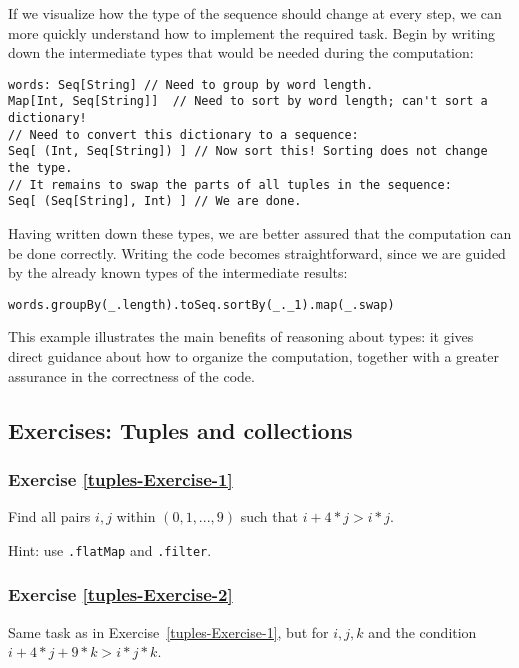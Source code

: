 If we visualize how the type of the sequence should change at every
step, we can more quickly understand how to implement the required
task. Begin by writing down the intermediate types that would be needed
during the computation:
\begin{lstlisting}
words: Seq[String] // Need to group by word length.
Map[Int, Seq[String]]  // Need to sort by word length; can't sort a dictionary!
// Need to convert this dictionary to a sequence:
Seq[ (Int, Seq[String]) ] // Now sort this! Sorting does not change the type.
// It remains to swap the parts of all tuples in the sequence:
Seq[ (Seq[String], Int) ] // We are done.
\end{lstlisting}
Having written down these types, we are better assured that the computation
can be done correctly. Writing the code becomes straightforward, since
we are guided by the already known types of the intermediate results:
\begin{lstlisting}
words.groupBy(_.length).toSeq.sortBy(_._1).map(_.swap)
\end{lstlisting}
This example illustrates the main benefits of reasoning about types:
it gives direct guidance about how to organize the computation, together
with a greater assurance in the correctness of the code.

\subsection{Exercises: Tuples and collections}

\subsubsection{Exercise \label{tuples-Exercise-1}\ref{tuples-Exercise-1}}

Find all pairs $i,j$ within $\left(0,1,...,9\right)$ such that $i+4*j>i*j$.

Hint: use \lstinline!.flatMap!
and \lstinline!.filter!.

\subsubsection{Exercise \label{tuples-Exercise-2}\ref{tuples-Exercise-2}}

Same task as in Exercise~\ref{tuples-Exercise-1}, but for $i,j,k$
and the condition $i+4*j+9*k>i*j*k$.

